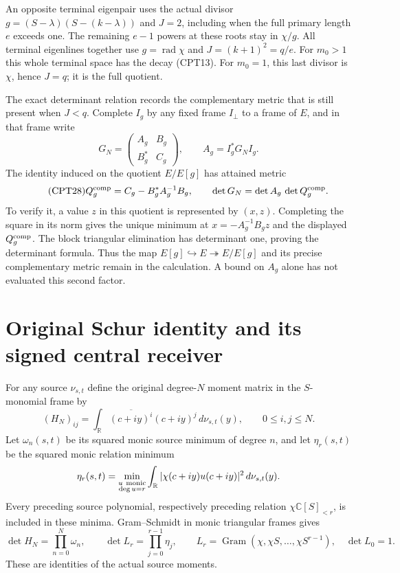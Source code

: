 \documentclass[11pt]{article}
\newcommand{\C}{\mathbb C}
\newcommand{\R}{\mathbb R}
\DeclareMathOperator{\rad}{rad}
\begin{document}
An opposite terminal eigenpair uses the actual divisor
\(g=(S-\lambda)(S-(k-\lambda))\) and \(J=2\), including when
the full primary length \(e\) exceeds one.  The remaining
\(e-1\) powers at these roots stay in \(\chi/g\).
All terminal eigenlines together use \(g=\rad\chi\) and
\(J=(k+1)^2=q/e\).  For \(m_0>1\) this whole terminal space
has the decay (CPT13).  For \(m_0=1\), this last divisor is
\(\chi\), hence \(J=q\); it is the full quotient.

The exact determinant relation records the complementary metric
that is still present when \(J<q\).  Complete \(I_g\) by any fixed
frame \(I_\perp\) to a frame of \(E\), and in that frame write
\[
 G_N=\begin{pmatrix} A_g&B_g\\B_g^*&C_g\end{pmatrix},
 \qquad A_g=I_g^*G_NI_g.
\]
The identity induced on the quotient \(E/E[g]\) has attained
metric
\begin{equation}\tag{CPT28}
 Q_g^{\rm comp}=C_g-B_g^*A_g^{-1}B_g,\qquad
 \det G_N=\det A_g\,\det Q_g^{\rm comp}.
\end{equation}
To verify it, a value \(z\) in this quotient is represented by
\((x,z)\).  Completing the square in its norm gives the unique
minimum at \(x=-A_g^{-1}B_gz\) and the displayed \(Q_g^{\rm comp}\).
The block triangular elimination has determinant one, proving
the determinant formula.  Thus the map \(E[g]\hookrightarrow
E\twoheadrightarrow E/E[g]\) and its precise complementary
metric remain in the calculation.  A bound on \(A_g\) alone
has not evaluated this second factor.

\section{Original Schur identity and its signed central receiver}
\label{sec:determinants}

For any source \(\nu_{s,t}\) define the original degree-\(N\)
moment matrix in the \(S\)-monomial frame by
\[
 (H_N)_{ij}=\int_\R
       \overline{(c+iy)^i}(c+iy)^j\,d\nu_{s,t}(y),
 \qquad 0\le i,j\le N.
\]
Let \(\omega_n(s,t)\) be its squared monic source minimum of
degree \(n\), and let \(\eta_r(s,t)\) be the squared monic
relation minimum
\[
 \eta_r(s,t)=
 \min_{\substack{u\ {\rm monic}\\\deg u=r}}
 \int_\R|\chi(c+iy)u(c+iy)|^2\,d\nu_{s,t}(y).
\]
Every preceding source polynomial, respectively preceding
relation \(\chi\C[S]_{<r}\), is included in these minima.
Gram--Schmidt in monic triangular frames gives
\[
 \det H_N=\prod_{n=0}^N\omega_n,\qquad
 \det L_r=\prod_{j=0}^{r-1}\eta_j,
 \qquad
 L_r=\operatorname{Gram}(\chi,\chi S,\ldots,\chi S^{r-1}),
 \quad \det L_0=1.
\]
These are identities of the actual source moments.
\end{document}
